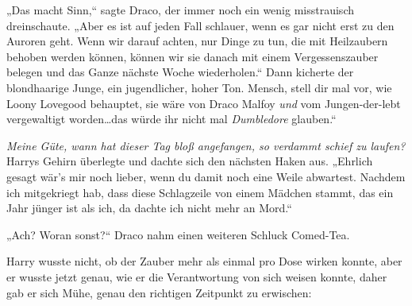 „Das macht Sinn,“ sagte Draco, der immer noch ein wenig misstrauisch dreinschaute.
„Aber es ist auf jeden Fall schlauer, wenn es gar nicht erst zu den Auroren geht. Wenn wir darauf achten, nur Dinge zu tun, die mit Heilzaubern behoben werden können, können wir sie danach mit einem Vergessenszauber belegen und das Ganze nächste Woche wiederholen.“
Dann kicherte der blondhaarige Junge, ein jugendlicher, hoher Ton.
Mensch, stell dir mal vor, wie Loony Lovegood behauptet, sie wäre von Draco Malfoy \emph{und} vom Jungen-der-lebt vergewaltigt worden…das würde ihr nicht mal \emph{Dumbledore} glauben.“


\emph{Meine Güte, wann hat dieser Tag bloß angefangen, so verdammt schief zu laufen?} Harrys Gehirn überlegte und dachte sich den nächsten Haken aus. „Ehrlich gesagt wär’s mir noch lieber, wenn du damit noch eine Weile abwartest. Nachdem ich mitgekriegt hab, dass diese Schlagzeile von einem Mädchen stammt, das ein Jahr jünger ist als ich, da dachte ich nicht mehr an Mord.“

„Ach? Woran sonst?“ Draco nahm einen weiteren Schluck Comed-Tea.

Harry wusste nicht, ob der Zauber mehr als einmal pro Dose wirken konnte, aber er wusste jetzt genau, wie er die Verantwortung von sich weisen konnte, daher gab er sich Mühe, genau den richtigen Zeitpunkt zu erwischen:


